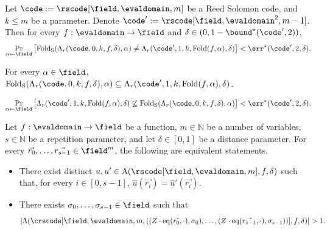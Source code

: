 \begin{lemma}\label{lemma:folding_preserves_listdecoding_base}
    Let $\code := \rscode[\field, \evaldomain, m]$ be a Reed Solomon code, and $k \leq m$ be a parameter. Denote $\code' := \rscode[\field, \evaldomain^{2}, m - 1]$. Then for every $f : \evaldomain \to \field$ and $\delta \in (0, 1 - {\bound}^\star(\code', 2))$,
    \[
    \Pr_{\alpha \leftarrow \field} \left[
    \mathrm{Fold_S}(\Lambda_{r}(\code, 0, k, f, \delta), \alpha)
    \neq \Lambda_{r}(\code', 1, k, \mathrm{Fold}(f, \alpha), \delta)
    \right] < \err^\star(\code', 2, \delta).
    \]
\end{lemma}
    
\begin{lemma}\label{lemma:folding_preserves_listdecoding_bound}
    For every $\alpha \in \field$, $\mathrm{Fold_S}(\Lambda_{r}(\code, 0, k, f, \delta), \alpha) \subseteq \Lambda_{r}(\code', 1, k, \mathrm{Fold}(f, \alpha), \delta)$.
\end{lemma}

\begin{lemma}\label{lemma:folding_preserves_listdecoding_base_ne_subset}
    \[
    \Pr_{\alpha \leftarrow \field} \left[
    \Lambda_{r}(\code', 1, k, \mathrm{Fold}(f, \alpha), \delta)
    \not\subseteq \mathrm{Fold_S}(\Lambda_{r}(\code, 0, k, f, \delta), \alpha)
    \right] < \err^\star(\code', 2, \delta).
    \]
\end{lemma}

\begin{lemma}\label{lemma:crs_equiv_rs_randpompt_agreement}
    Let $f : \evaldomain \rightarrow \field$ be a function, $m \in \mathbb{N}$ be a number of variables, $s \in \mathbb{N}$ be a repetition parameter, and let $\delta \in [0,1]$ be a distance parameter. For every $\vec{r_0}, \dots, \vec{r_{s-1}} \in \field^m$, the following are equivalent statements.
\begin{itemize}
    \item There exist distinct $u, u' \in \Lambda(\rscode[\field, \evaldomain, m], f, \delta)$ such that, for every $i \in [0,s-1]$, $\hat{u}(\vec{r_i}) = \hat{u}'(\vec{r_i})$.
    \item There exists $\sigma_0, \dots, \sigma_{s-1} \in \field$ such that $$\left| \Lambda(\crscode[\field, \evaldomain, m, ((Z \cdot \mathrm{eq}(\vec{r_0}, \cdot), \sigma_0), \dots, (Z \cdot \mathrm{eq}(\vec{r_{s-1}}, \cdot), \sigma_{s-1}))], f, \delta) \right| > 1.$$
\end{itemize}
\end{lemma}

